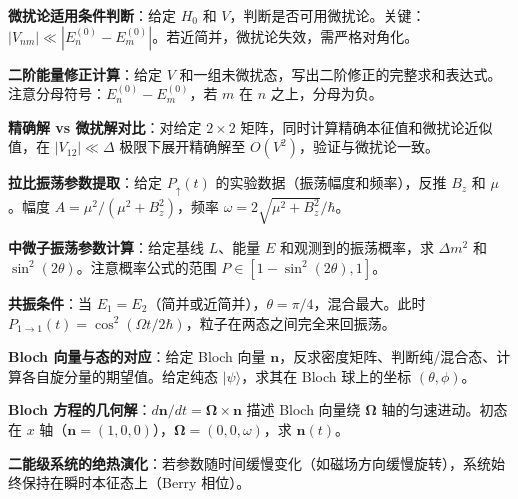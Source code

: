 \begin{drillbox}[训练点与考法变体]
 \textbf{微扰论适用条件判断}：给定 $H_0$ 和 $V$，判断是否可用微扰论。关键：$|V_{nm}|\ll|E_n^{(0)}-E_m^{(0)}|$。若近简并，微扰论失效，需严格对角化。

 \textbf{二阶能量修正计算}：给定 $V$ 和一组未微扰态，写出二阶修正的完整求和表达式。注意分母符号：$E_n^{(0)}-E_m^{(0)}$，若 $m$ 在 $n$ 之上，分母为负。

 \textbf{精确解 vs 微扰解对比}：对给定 $2\times2$ 矩阵，同时计算精确本征值和微扰论近似值，在 $|V_{12}|\ll\Delta$ 极限下展开精确解至 $O(V^2)$，验证与微扰论一致。

 \textbf{拉比振荡参数提取}：给定 $P_{\uparrow}(t)$ 的实验数据（振荡幅度和频率），反推 $B_z$ 和 $\mu$。幅度 $A=\mu^2/(\mu^2+B_z^2)$，频率 $\omega=2\sqrt{\mu^2+B_z^2}/\hbar$。

 \textbf{中微子振荡参数计算}：给定基线 $L$、能量 $E$ 和观测到的振荡概率，求 $\Delta m^2$ 和 $\sin^2(2\theta)$。注意概率公式的范围 $P\in[1-\sin^2(2\theta),1]$。

 \textbf{共振条件}：当 $E_1=E_2$（简并或近简并），$\theta=\pi/4$，混合最大。此时 $P_{1\to1}(t)=\cos^2(\Omega t/2\hbar)$，粒子在两态之间完全来回振荡。

 \textbf{Bloch 向量与态的对应}：给定 Bloch 向量 $\mathbf{n}$，反求密度矩阵、判断纯/混合态、计算各自旋分量的期望值。给定纯态 $|\psi\rangle$，求其在 Bloch 球上的坐标 $(\theta,\phi)$。

 \textbf{Bloch 方程的几何解}：$d\mathbf{n}/dt=\boldsymbol{\Omega}\times\mathbf{n}$ 描述 Bloch 向量绕 $\boldsymbol{\Omega}$ 轴的匀速进动。初态在 $x$ 轴（$\mathbf{n}=(1,0,0)$），$\boldsymbol{\Omega}=(0,0,\omega)$，求 $\mathbf{n}(t)$。

 \textbf{二能级系统的绝热演化}：若参数随时间缓慢变化（如磁场方向缓慢旋转），系统始终保持在瞬时本征态上（Berry 相位）。
\end{drillbox}

